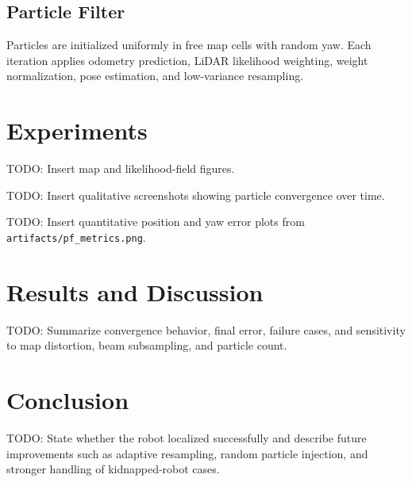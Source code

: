 \documentclass[letterpaper, 10 pt, conference]{ieeeconf}
\begin{document}
\subsection{Particle Filter}
Particles are initialized uniformly in free map cells with random yaw. Each
iteration applies odometry prediction, LiDAR likelihood weighting, weight
normalization, pose estimation, and low-variance resampling.

\section{Experiments}
TODO: Insert map and likelihood-field figures.

TODO: Insert qualitative screenshots showing particle convergence over time.

TODO: Insert quantitative position and yaw error plots from
\texttt{artifacts/pf\_metrics.png}.

\section{Results and Discussion}
TODO: Summarize convergence behavior, final error, failure cases, and sensitivity
to map distortion, beam subsampling, and particle count.

\section{Conclusion}
TODO: State whether the robot localized successfully and describe future
improvements such as adaptive resampling, random particle injection, and stronger
handling of kidnapped-robot cases.
\end{document}
